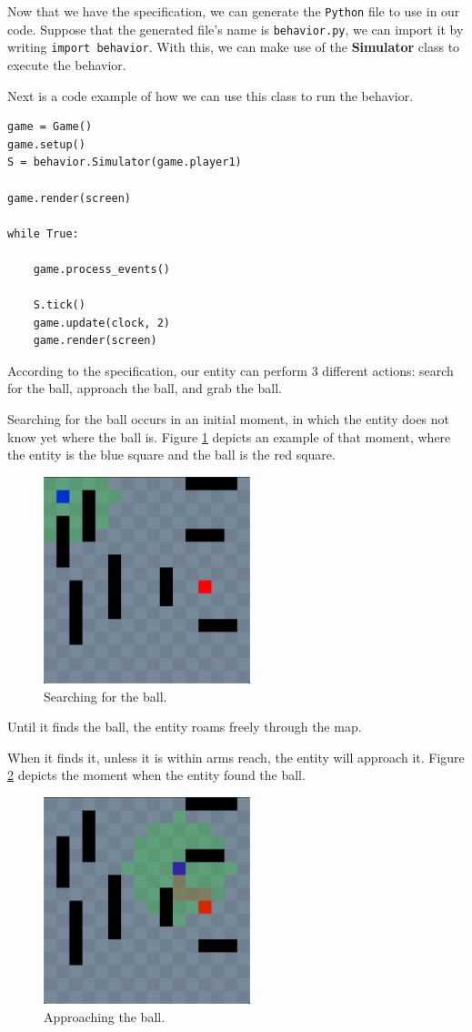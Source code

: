 \documentclass[a4paper,UKenglish,cleveref, autoref, thm-restate]{oasics-v2019}
\begin{document}
Now that we have the specification, we can generate the \texttt{Python} file to use in our code.
Suppose that the generated file's name is \texttt{behavior.py}, we can import it by writing \texttt{import behavior}.
With this, we can make use of the \textbf{Simulator} class to execute the behavior.

Next is a code example of how we can use this class to run the behavior.

\begin{lstlisting}
game = Game()
game.setup()
S = behavior.Simulator(game.player1)

game.render(screen)

while True:
    
    game.process_events()

    S.tick()
    game.update(clock, 2)
    game.render(screen)
\end{lstlisting}

According to the specification, our entity can perform 3 different actions: search for the ball, approach the ball, and grab the ball.

Searching for the ball occurs in an initial moment, in which the entity does not know yet where the ball is.
Figure \ref{fig:searching} depicts an example of that moment, where the entity is the blue square and the ball is the red square.
\begin{figure}
    \centering
    \includegraphics[width=6cm]{Searching.png}
    \caption{Searching for the ball.}
    \label{fig:searching}
\end{figure}

Until it finds the ball, the entity roams freely through the map.

When it finds it, unless it is within arms reach, the entity will approach it.
Figure \ref{fig:approaching} depicts the moment when the entity found the ball.
\begin{figure}
    \centering
    \includegraphics[width=6cm]{Approaching.png}
    \caption{Approaching the ball.}
    \label{fig:approaching}
\end{figure}
\end{document}
